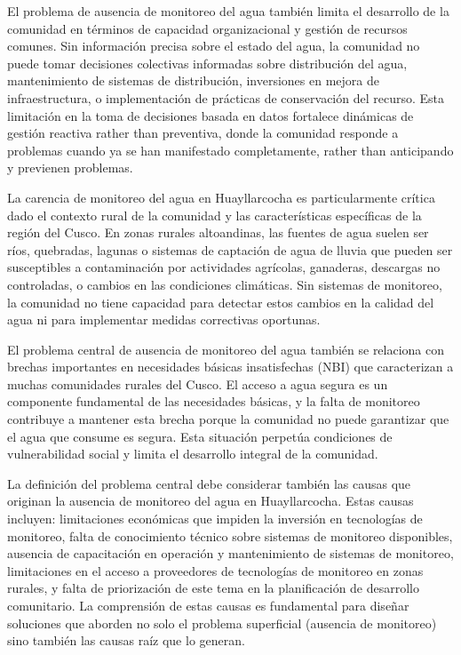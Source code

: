 El problema de ausencia de monitoreo del agua también limita el desarrollo de la comunidad en términos de capacidad organizacional y gestión de recursos comunes. Sin información precisa sobre el estado del agua, la comunidad no puede tomar decisiones colectivas informadas sobre distribución del agua, mantenimiento de sistemas de distribución, inversiones en mejora de infraestructura, o implementación de prácticas de conservación del recurso. Esta limitación en la toma de decisiones basada en datos fortalece dinámicas de gestión reactiva rather than preventiva, donde la comunidad responde a problemas cuando ya se han manifestado completamente, rather than anticipando y previenen problemas.

La carencia de monitoreo del agua en Huayllarcocha es particularmente crítica dado el contexto rural de la comunidad y las características específicas de la región del Cusco. En zonas rurales altoandinas, las fuentes de agua suelen ser ríos, quebradas, lagunas o sistemas de captación de agua de lluvia que pueden ser susceptibles a contaminación por actividades agrícolas, ganaderas, descargas no controladas, o cambios en las condiciones climáticas. Sin sistemas de monitoreo, la comunidad no tiene capacidad para detectar estos cambios en la calidad del agua ni para implementar medidas correctivas oportunas.

El problema central de ausencia de monitoreo del agua también se relaciona con brechas importantes en necesidades básicas insatisfechas (NBI) que caracterizan a muchas comunidades rurales del Cusco. El acceso a agua segura es un componente fundamental de las necesidades básicas, y la falta de monitoreo contribuye a mantener esta brecha porque la comunidad no puede garantizar que el agua que consume es segura. Esta situación perpetúa condiciones de vulnerabilidad social y limita el desarrollo integral de la comunidad.

La definición del problema central debe considerar también las causas que originan la ausencia de monitoreo del agua en Huayllarcocha. Estas causas incluyen: limitaciones económicas que impiden la inversión en tecnologías de monitoreo, falta de conocimiento técnico sobre sistemas de monitoreo disponibles, ausencia de capacitación en operación y mantenimiento de sistemas de monitoreo, limitaciones en el acceso a proveedores de tecnologías de monitoreo en zonas rurales, y falta de priorización de este tema en la planificación de desarrollo comunitario. La comprensión de estas causas es fundamental para diseñar soluciones que aborden no solo el problema superficial (ausencia de monitoreo) sino también las causas raíz que lo generan.

